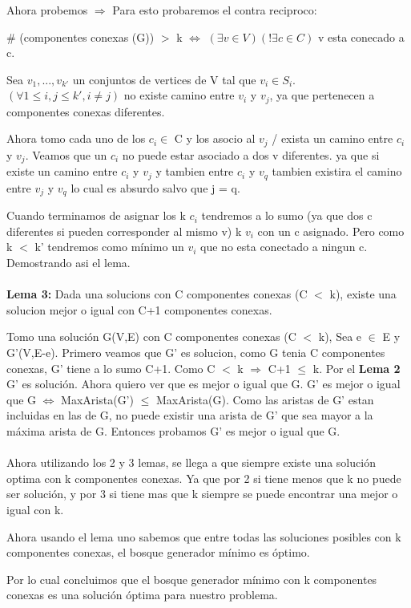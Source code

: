Ahora probemos $\Rightarrow$
Para esto probaremos el contra reciproco:

$\#$ (componentes conexas (G)) $>$ k  $\Leftrightarrow$ $(\exists v \in V)(! \exists c \in C)$ v esta conecado a c. 

Sea ${v_1,...,v_{k'}}$ un conjuntos de vertices de V tal que $v_i \in S_i$. $(\forall 1 \leq i,j \leq k', i \neq j)$ no existe camino entre $v_i$ y $v_j$, ya que pertenecen a componentes conexas diferentes.

Ahora tomo cada uno de los $c_i \in$ C y los asocio al $v_j$ / exista un camino entre $c_i$ y $v_j$. Veamos que un $c_i$ no puede estar asociado a dos v diferentes. ya que si existe un camino entre $c_i$ y $v_j$ y tambien entre $c_i$ y $v_q$ tambien existira el camino entre $v_j$ y $v_q$ lo cual es absurdo salvo que j = q.

Cuando terminamos de asignar los k $c_i$ tendremos a lo sumo (ya que dos c diferentes si pueden corresponder al mismo v) k $v_i$ con un c asignado. Pero como k $<$ k' tendremos como mínimo un $v_i$ que no esta conectado a ningun c. Demostrando asi el lema. \\ \\


\textbf{Lema 3:} Dada una solucions con C componentes conexas (C $<$ k), existe una solucion mejor o igual con C+1 componentes conexas.

Tomo una solución G(V,E) con C componentes conexas (C $<$ k), Sea e $\in$ E y G'(V,E-e).
Primero veamos que G' es solucion, como G tenia C componentes conexas, G' tiene a lo sumo C+1. Como C $<$ k $\Rightarrow$ C+1 $\leq$ k. Por el \textbf{Lema 2} G' es solución. 
Ahora quiero ver que es mejor o igual que G.
G' es mejor o igual que G $\Leftrightarrow$ MaxArista(G') $\leq$ MaxArista(G).
Como las aristas de G' estan incluidas en las de G, no puede existir una arista de G' que sea mayor a la máxima arista de G.
Entonces probamos G' es mejor o igual que G. \\ \\

Ahora utilizando los 2 y 3 lemas, se llega a que siempre existe una solución optima con k componentes conexas.
Ya que por 2 si tiene menos que k no puede ser solución, y por 3 si tiene mas que k siempre se puede encontrar una mejor o igual con k.

Ahora usando el lema uno sabemos que entre todas las soluciones posibles con k componentes conexas, el bosque generador mínimo es óptimo.

Por lo cual concluimos que el bosque generador mínimo con k componentes conexas es una solución óptima para nuestro problema.